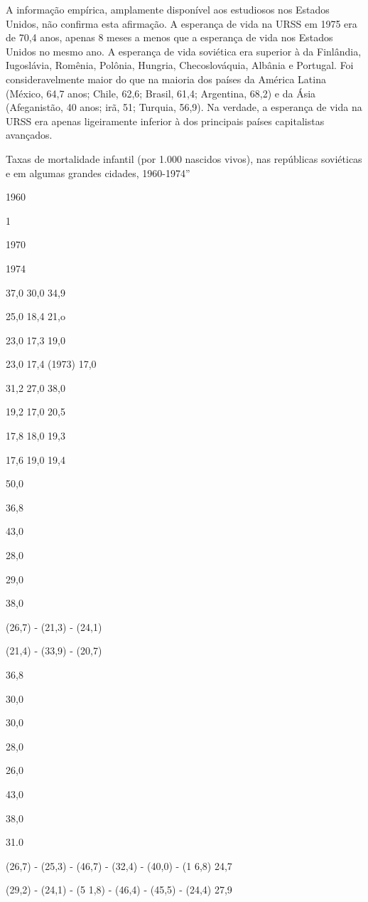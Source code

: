 \documentclass[twocolumn,amsmath,amssymb,aps,pre,floatfix]{revtex4-2}
\begin{document}
\par
A informação empírica, amplamente disponível aos estudiosos nos Estados Unidos, não confirma esta afirmação. A esperança de vida na URSS em 1975 era de 70,4 anos, apenas 8 meses a menos que a esperança de vida nos Estados Unidos no mesmo ano. A esperança de vida soviética era superior à da Finlândia, Iugoslávia, Romênia, Polônia, Hungria, Checoslováquia, Albânia e Portugal. Foi consideravelmente maior do que na maioria dos países da América Latina (México, 64,7 anos; Chile, 62,6; Brasil, 61,4; Argentina, 68,2) e da Ásia (Afeganistão, 40 anos; irã, 51; Turquia, 56,9). Na verdade, a esperança de vida na URSS era apenas ligeiramente inferior à dos principais países capitalistas avançados.
\par
Taxas de mortalidade infantil (por 1.000 nascidos vivos), nas repúblicas soviéticas e em algumas grandes cidades, 1960-1974”
\par
1960
\par
1%
\par
1970
\par
1974
\par
37,0 30,0 34,9
\par
25,0 18,4 21,o
\par
23,0 17,3 19,0
\par
23,0 17,4 (1973) 17,0
\par
31,2 27,0 38,0
\par
19,2 17,0 20,5
\par
17,8 18,0 19,3
\par
17,6 19,0 19,4
\par
50,0
\par
36,8
\par
43,0
\par
28,0
\par
29,0
\par
38,0
\par
(26,7) - (21,3) - (24,1)
\par
(21,4) - (33,9) - (20,7)
\par
36,8
\par
30,0
\par
30,0
\par
28,0
\par
26,0
\par
43,0
\par
38,0
\par
31.0
\par
(26,7) - (25,3) - (46,7) - (32,4) - (40,0) - (1 6,8) 24,7
\par
(29,2) - (24,1) - (5 1,8) - (46,4) - (45,5) - (24,4) 27,9
\end{document}
